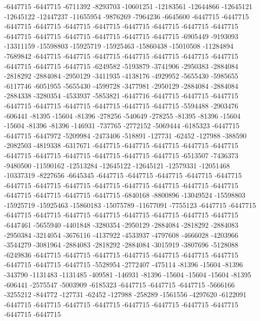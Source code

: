 -6447715 -6447715 -6711392 -8293703 -10601251 -12183561 -12644866 -12645121 -12645122 -12447237 -11655954 -9876269 -7964236 -6645600 -6447715 -6447715 -6447715 -6447715 -6447715 -6447715 -6447715 -6447715 -6447715 -6447715 -6447715 -6447715 -6447715 -6447715 -6447715 -6447715 -6905449 -9193093 -13311159 -15598803 -15925719 -15925463 -15860438 -15010508 -11284894 -7689842 -6447715 -6447715 -6447715 -6447715 -6447715 -6447715 -6447715 -6447715 -6447715 -6447715 -6249582 -5193879 -3741906 -2950383 -2884084 -2818292 -2884084 -2950129 -3411935 -4138176 -4929952 -5655430 -5985655 -6117746 -6051955 -5655430 -4599728 -3477981 -2950129 -2884084 -2884084 -2884338 -3280354 -4533937 -5853821 -6447716 -6447715 -6447715 -6447715 -6447715 -6447715 -6447715 -6447715 -6447715 -6447715 -5594488 -2903476 -606441 -81395 -15604 -81396 -278256 -540649 -278255 -81395 -81396 -15604 -15604 -81396 -81396 -146931 -737765 -2772152 -5069444 -6185323 -6447715 -6447715 -6447972 -5209984 -2473406 -518891 -127731 -62452 -127988 -388590 -2082503 -4819338 -6317671 -6447715 -6447715 -6447715 -6447715 -6447715 -6447715 -6447715 -6447715 -6447715 -6447715
-6447715 -6513507 -7436373 -9480500 -11590162 -12513284 -12645122 -12645121 -12579331 -12051468 -10337319 -8227656 -6645345 -6447715 -6447715 -6447715 -6447715 -6447715 -6447715 -6447715 -6447715 -6447715 -6447715 -6447715 -6447715 -6447715 -6447715 -6447715 -6447715 -6447715 -6840168 -8800896 -13049524 -15598803 -15925719 -15925463 -15860183 -15075789 -11677091 -7755123 -6447715 -6447715 -6447715 -6447715 -6447715 -6447715 -6447715 -6447715 -6447715 -6447715 -6447461 -5655940 -4401848 -3280354 -2950129 -2884084 -2818292 -2884083 -2950384 -3214054 -3676116 -4137922 -4533937 -4797608 -4666028 -4203966 -3544279 -3081964 -2884083 -2818292 -2884084 -3015919 -3807696 -5128088 -6249836 -6447715 -6447715 -6447715 -6447715 -6447715 -6447715 -6447715 -6447715 -6447715 -6447715 -5528954 -2772407 -475114 -81396 -15604 -81396 -343790 -1131483 -1131485 -409581 -146931 -81396 -15604 -15604 -15604 -81395 -606441 -2575547 -5003909 -6185323 -6447715 -6447715 -6447715 -5666166 -3255212 -844772 -127731 -62452 -127988 -258289 -1561556 -4297620 -6122091 -6447715 -6447715 -6447715 -6447715 -6447715 -6447715 -6447715 -6447715 -6447715 -6447715
